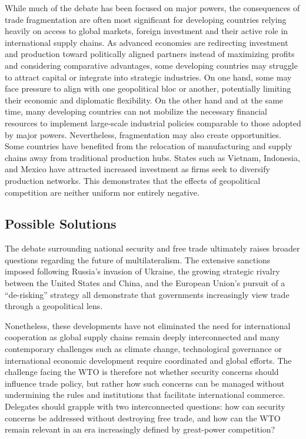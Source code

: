 While much of the debate has been focused on major powers, the consequences of trade fragmentation are often most significant for developing countries relying heavily on access to global markets, foreign investment and their active role in international supply chains. As advanced economies are redirecting investment and production toward politically aligned partners instead of maximizing profits and considering comparative advantages, some developing countries may struggle to attract capital or integrate into strategic industries. On one hand, some may face pressure to align with one geopolitical bloc or another, potentially limiting their economic and diplomatic flexibility. On the other hand and at the same time, many developing countries can not mobilize the necessary financial resources to implement large-scale industrial policies comparable to those adopted by major powers. Nevertheless, fragmentation may also create opportunities. Some countries have benefited from the relocation of manufacturing and supply chains away from traditional production hubs. States such as Vietnam, Indonesia, and Mexico have attracted increased investment as firms seek to diversify production networks. This demonstrates that the effects of geopolitical competition are neither uniform nor entirely negative.

\subsection{Possible Solutions}

The debate surrounding national security and free trade ultimately raises broader questions regarding the future of multilateralism. The extensive sanctions imposed following Russia's invasion of Ukraine, the growing strategic rivalry between the United States and China, and the European Union's pursuit of a “de-risking” strategy all demonstrate that governments increasingly view trade through a geopolitical lens.

Nonetheless, these developments have not eliminated the need for international cooperation as global supply chains remain deeply interconnected and many contemporary challenges such as climate change, technological governance or international economic development require coordinated and global efforts. The challenge facing the WTO is therefore not whether security concerns should influence trade policy, but rather how such concerns can be managed without undermining the rules and institutions that facilitate international commerce. Delegates should grapple with two interconnected questions: how can security concerns be addressed without destroying free trade, and how can the WTO remain relevant in an era increasingly defined by great-power competition?

